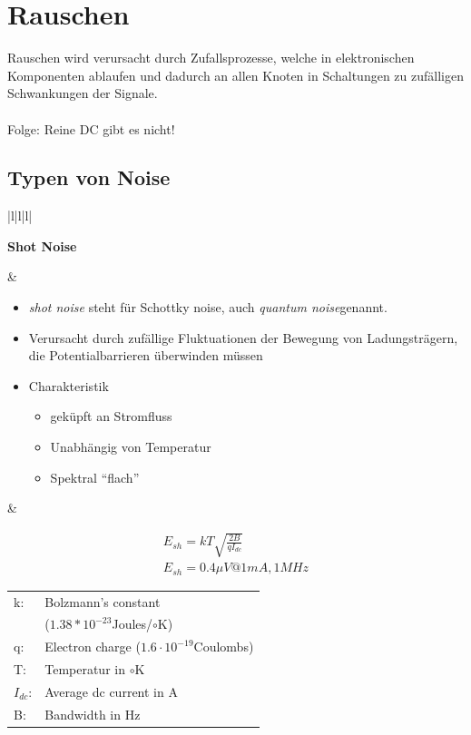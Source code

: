 \section{Rauschen}
Rauschen wird verursacht durch Zufallsprozesse, welche in elektronischen
Komponenten ablaufen und dadurch an allen Knoten in Schaltungen zu zufälligen
Schwankungen der Signale.\\
\\
Folge: Reine DC gibt es nicht!

\subsection{Typen von Noise}
\begin{longtable}{|l|l|l|}
\hline
\begin{minipage}{4cm}
\textbf{Shot Noise}
\end{minipage}
&
\begin{minipage}{6cm}
\begin{itemize}
  \item \textit{shot noise} steht für Schottky noise, auch \textit{quantum
  noise}genannt.
  \item Verursacht durch zufällige Fluktuationen der Bewegung von
  Ladungsträgern, die Potentialbarrieren überwinden müssen
  \item Charakteristik
  \begin{itemize}
    \item geküpft an Stromfluss
    \item Unabhängig von Temperatur
    \item Spektral "`flach"'
    \end{itemize}
\end{itemize}
\end{minipage}
&
\begin{minipage}{8cm}
\begin{gather}
E_{sh}=kT\sqrt{\frac{2B}{qI_{dc}}}\\
E_{sh}= 0.4\mu V @ 1mA,1MHz
\end{gather}
\begin{tabular}{ll}
k: &Bolzmann's constant\\&($1.38*10^{-23}$Joules/$\circ$K)\\
q:& Electron charge ($1.6 \cdot 10^{-19}$Coulombs)\\
T:&Temperatur in $\circ$K\\
$I_{dc}$:& Average dc current in A\\
B:&Bandwidth in Hz
\end{tabular}

\end{minipage}
\end{longtable}
